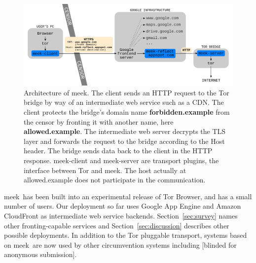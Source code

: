 \documentclass[conference]{IEEEtran}
\newcommand{\meekclient}{\mbox{meek-client}\xspace}
\newcommand{\meekserver}{\mbox{meek-server}\xspace}
\newcommand{\meek}{meek\xspace}
\def\urll#1{\begin{NoHyper}\url{#1}\end{NoHyper}}
\begin{document}
\begin{figure}
\centering
\includegraphics[width=\linewidth]{architecture}
\caption{
Architecture of \meek.
The client sends an HTTP request to the Tor bridge by way of an intermediate web service such as a CDN.
The client protects the bridge's domain name \textbf{forbidden.example} from the censor
by fronting it with another name, here \textbf{allowed.example}.
The intermediate web server decrypts the TLS layer and forwards the request to the bridge
according to the Host header.
The bridge sends data back to the client in the HTTP response.
\meekclient and \meekserver are transport plugins, the interface between Tor and \meek.
The host actually at allowed.example does not participate in the communication.
}
\label{fig:architecture}
\end{figure}

\meek\ has been built into an experimental release of Tor Browser,
and has a small number of users.
Our deployment so far uses Google App Engine and Amazon CloudFront
as intermediate web service backends.
Section~\ref{sec:survey} names other fronting-capable services
and Section~\ref{sec:discussion} describes other possible deployments.
In addition to the Tor pluggable transport,
systems based on \meek\ are now used by other circumvention systems including
[blinded for anonymous submission].

\end{document}
